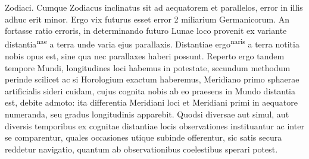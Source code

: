 {Zodiaci\protect{}. Cumque Zodiacus\protect{} inclinatus sit ad aequatorem\protect{} et parallelos\protect{}, error in illis adhuc erit minor. Ergo vix futurus esset error 2 miliarium Germanicorum. An fortasse ratio erroris, in determinando futuro Lunae\protect{} loco provenit ex variante distantia\rightmoon\textsuperscript{nae} a terra unde varia ejus parallaxis\protect{}. Distantiae ergo\rightmoon\textsuperscript{naris} a terra notitia nobis opus est, sine qua nec parallaxes\protect{} haberi possunt.}\pend
\pstart Reperto ergo tandem tempore Mundi, longitudines\protect{} loci habemus in potestate, secundum methodum  perinde scilicet ac si Horologium\protect{} exactum haberemus, Meridiano\protect{}  primo sphaerae artificialis  sideri\protect{} cuidam, cujus cognita nobis ab eo praesens in Mundo distantia est, debite admoto: ita differentia Meridiani\protect{} loci et Meridiani\protect{} primi in aequatore\protect{} numeranda, seu gradus longitudinis\protect{} apparebit. Quodsi diversae aut simul, aut diversis temporibus ex cognitae distantiae locis observationes instituantur ac inter se comparentur, quales occasiones utique subinde offerentur, sic satis secura reddetur navigatio, quantum ab observationibus coelestibus sperari potest.\pend 